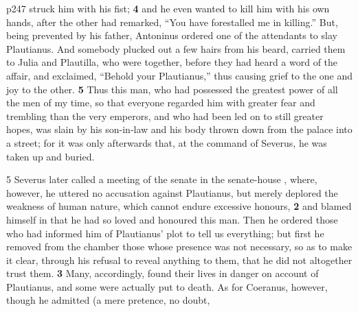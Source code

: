 p247 struck him with his fist; \textbf{4} and he even wanted to kill him with his own hands, after the other had remarked, ``You have forestalled me in killing.'' But, being prevented by his father, Antoninus ordered one of the attendants to slay Plautianus. And somebody plucked out a few hairs from his beard, carried them to Julia and Plautilla, who were together, before they had heard a word of the affair, and exclaimed, ``Behold your Plautianus,'' thus causing grief to the one and joy to the other. \textbf{5} Thus this man, who had possessed the greatest power of all the men of my time, so that everyone regarded him with greater fear and trembling than the very emperors, and who had been led on to still greater hopes, was slain by his son-in\texthebrew{‑}law and his body thrown down from the palace into a street; for it was only afterwards that, at the command of Severus, he was taken up and buried.

5 Severus later called a meeting of the senate in the senate-house , where, however, he uttered no accusation against Plautianus, but merely deplored the weakness of human nature, which cannot endure excessive honours, \textbf{2} and blamed himself in that he had so loved and honoured this man. Then he ordered those who had informed him of Plautianus' plot to tell us everything; but first he removed from the chamber those whose presence was not necessary, so as to make it clear, through his refusal to reveal anything to them, that he did not altogether trust them. \textbf{3} Many, accordingly, found their lives in danger on account of Plautianus, and some were actually put to death. As for Coeranus, however, though he admitted (a mere pretence, no doubt,

